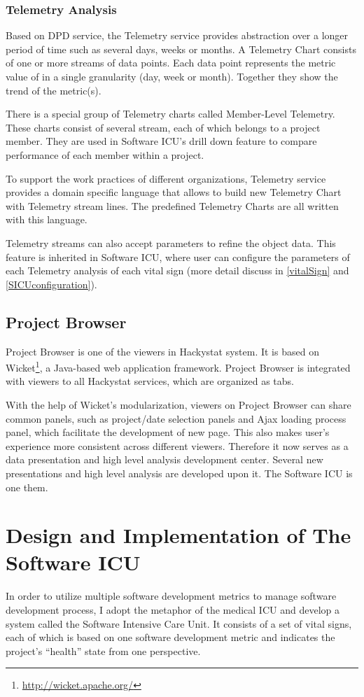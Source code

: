 \subsection{Telemetry Analysis}
Based on DPD service, the Telemetry service provides abstraction over a longer period of time such as several days, weeks or months. A Telemetry Chart consists of one or more streams of data points. Each data point represents the metric value of in a single granularity (day, week or month). Together they show the trend of the metric(s).

There is a special group of Telemetry charts called Member-Level Telemetry. These charts consist of several stream, each of which belongs to a project member. They are used in Software ICU's drill down feature to compare performance of each member within a project. 

To support the work practices of different organizations, Telemetry service provides a domain specific language that allows to build new Telemetry Chart with Telemetry stream lines. The predefined Telemetry Charts are all written with this language.

Telemetry streams can also accept parameters to refine the object data. This feature is inherited in Software ICU, where user can configure the parameters of each Telemetry analysis of each vital sign (more detail discuss in \autoref{vitalSign} and \autoref{SICUconfiguration}).

\section {Project Browser}
Project Browser is one of the viewers in Hackystat system. It is based on Wicket\footnote{\url{http://wicket.apache.org/}}, a Java-based web application framework. Project Browser is integrated with viewers to all Hackystat services, which are organized as tabs. 

With the help of Wicket's modularization, viewers on Project Browser can share common panels, such as project/date selection panels and Ajax loading process panel, which facilitate the development of new page. This also makes user's experience more consistent across different viewers. Therefore it now serves as a data presentation and high level analysis development center. Several new presentations and high level analysis are developed upon it. The Software ICU is one them.

\chapter{Design and Implementation of The Software ICU}
In order to utilize multiple software development metrics to manage software development process, I adopt the metaphor of the medical ICU and develop a system called the Software Intensive Care Unit. It consists of a set of vital signs, each of which is based on one software development metric and indicates the project's ``health'' state from one perspective.

